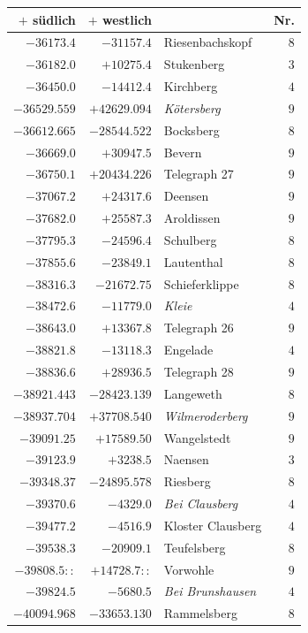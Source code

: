 \clearpage{}%
\begin{center}\begingroup\fontsize{8}{9}\selectfont
\setlength{\tabcolsep}{4pt}
\begin{tabular}{r|r|p{170pt}|r}\hline
\(+\) südlich&\(+\) westlich&&Nr.\\\hline
\(-36173.4\)&\(-31157.4\)&Riesenbachskopf&\(8\)\\
\(-36182.0\)&\(+10275.4\)&Stukenberg&\(3\)\\
\(-36450.0\)&\(-14412.4\)&Kirchberg&\(4\)\\
\(-36529.559\)&\(+42629.094\)&\textit{Kötersberg}&\(9\)\\
\(-36612.665\)&\(-28544.522\)&Bocksberg&\(8\)\\
\(-36669.0\)&\(+30947.5\)&Bevern&\(9\)\\
\(-36750.1\)&\(+20434.226\)&Telegraph 27&\(9\)\\
\(-37067.2\)&\(+24317.6\)&Deensen&\(9\)\\
\(-37682.0\)&\(+25587.3\)&Aroldissen&\(9\)\\
\(-37795.3\)&\(-24596.4\)&Schulberg&\(8\)\\
\(-37855.6\)&\(-23849.1\)&Lautenthal&\(8\)\\
\(-38316.3\)&\(-21672.75\)&Schieferklippe&\(8\)\\
\(-38472.6\)&\(-11779.0\)&\textit{Kleie}&\(4\)\\
\(-38643.0\)&\(+13367.8\)&Telegraph 26&\(9\)\\
\(-38821.8\)&\(-13118.3\)&Engelade&\(4\)\\
\(-38836.6\)&\(+28936.5\)&Telegraph 28&\(9\)\\
\(-38921.443\)&\(-28423.139\)&Langeweth&\(8\)\\
\(-38937.704\)&\(+37708.540\)&\textit{Wilmeroderberg}&\(9\)\\
\(-39091.25\)&\(+17589.50\)&Wangelstedt&\(9\)\\
\(-39123.9\)&\(+3238.5\)&Naensen&\(3\)\\
\(-39348.37\)&\(-24895.578\)&Riesberg&\(8\)\\
\(-39370.6\)&\(-4329.0\)&\textit{Bei Clausberg}&\(4\)\\
\(-39477.2\)&\(-4516.9\)&Kloster Clausberg&\(4\)\\
\(-39538.3\)&\(-20909.1\)&Teufelsberg&\(8\)\\
\(-39808.5::\)&\(+14728.7::\)&Vorwohle&\(9\)\\
\(-39824.5\)&\(-5680.5\)&\textit{Bei Brunshausen}&\(4\)\\
\(-40094.968\)&\(-33653.130\)&Rammelsberg&\(8\)\\

\end{tabular}
\end{center}
